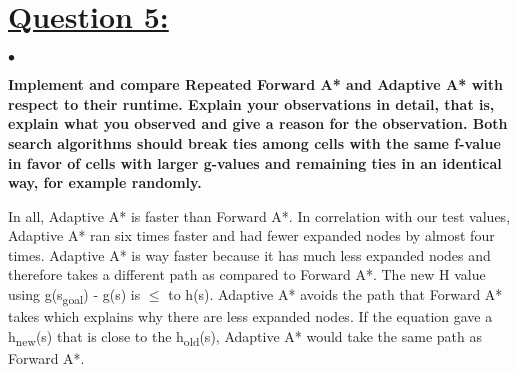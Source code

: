\documentclass{article}
\begin{document}
\section{\underline{Question 5:}}
$\bullet$ {\large \textbf{Implement and compare Repeated Forward A* and Adaptive A* with respect to their runtime. Explain your observations in detail, that is, explain what you observed and give a reason for the observation. Both search algorithms should break ties among cells with the same f-value in favor of cells with larger g-values and remaining ties in an identical way, for example randomly.}\\\par}
{\large In all, Adaptive A* is faster than Forward A*. In correlation with our test values, Adaptive A* ran six times faster and had fewer expanded nodes by almost four times. Adaptive A* is way faster because it has much less expanded nodes and therefore takes a different path as compared to Forward A*. The new H value using g(s\textsubscript{goal}) - g(s) is $\leq$ to h(s). Adaptive A* avoids the path that Forward A* takes which explains why there are less expanded nodes. If the equation gave a  h\textsubscript{new}(s) that is close to the  h\textsubscript{old}(s), Adaptive A* would take the same path as Forward A*.}
\newpage
\end{document}
